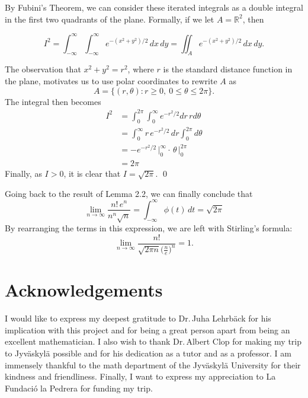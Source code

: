 \documentclass[12pt]{article}
\begin{document}
\vspace{1,5mm}

\noindent By Fubini's Theorem, we can consider these iterated integrals as a double integral in the first two quadrants of the plane. Formally, if we let $A=\mathbb{R}^2$, then 

$$I^2=\int_{-\infty}^\infty\int_{-\infty}^\infty e^{-(x^2+y^2)/2}\,dx\,dy=\iint_A e^{-(x^2+y^2)/2}\,dx\,dy.$$ 

\vspace{1mm}

\noindent The observation that $x^2+y^2=r^2$, where $r$ is the standard distance function in the plane, motivates us to use polar coordinates to rewrite $A$ as \[A=\{(r,\theta):r\geq0,\ 0\leq\theta\leq2\pi\}.\] The integral then becomes 
\begin{align*}
    I^2&=\int_{0}^{2\pi}\int_{0}^\infty e^{-r^2/2}dr\,rd\theta\\
    &=\int_{0}^\infty r\,e^{-r^2/2}\,dr\int_{0}^{2\pi}d\theta\\
    &=-e^{-r^2/2}\,\bigg|_{0}^\infty \cdot\, \theta\,\bigg|_{0}^{2\pi}\\
    &=2\pi
\end{align*}
\noindent Finally, as $I>0$, it is clear that $I=\sqrt{2\pi}.$ \qed

\vspace{4mm}

\noindent Going back to the result of Lemma 2.2, we can finally conclude that $$\lim_{n\to\infty}\frac{n!\,e^n}{n^n\sqrt{n}}=\int_{-\infty}^\infty\phi(t)\,dt=\sqrt{2\pi}$$ By rearranging the terms in this expression, we are left with Stirling's formula: $$\lim_{n\to\infty}\frac{n!}{\sqrt{2\pi n}\big(\frac{n}{e}\big)^n}=1.$$

\section*{Acknowledgements}

\noindent I would like to express my deepest gratitude to Dr.$\,$Juha Lehrbäck for his implication with this project and for being a great person apart from being an excellent mathematician. I also wish to thank Dr.$\,$Albert Clop for making my trip to Jyväskylä possible and for his dedication as a tutor and as a professor. I am immensely thankful to the math department of the Jyväskylä University for their kindness and friendliness. Finally, I want to express my appreciation to La Fundació la Pedrera for funding my trip.



\end{document}
